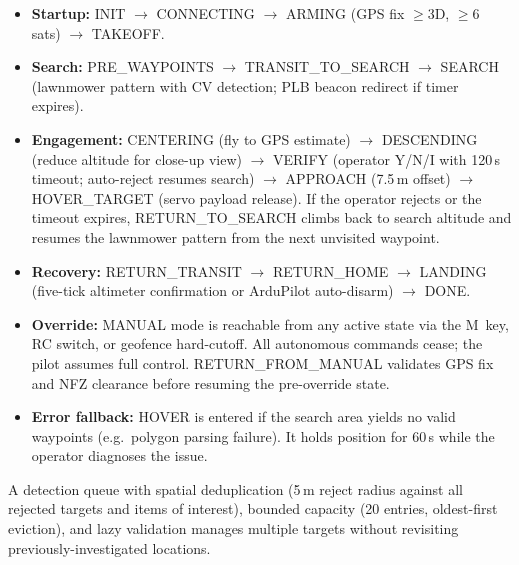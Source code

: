 \begin{itemize}
    \item \textbf{Startup:} INIT $\to$ CONNECTING $\to$ ARMING (GPS fix $\geq$3D, $\geq$6 sats) $\to$ TAKEOFF.
    \item \textbf{Search:} PRE\_WAYPOINTS $\to$ TRANSIT\_TO\_SEARCH $\to$ SEARCH (lawnmower pattern with CV detection; PLB beacon redirect if timer expires).
    \item \textbf{Engagement:} CENTERING (fly to GPS estimate) $\to$ DESCENDING (reduce altitude for close-up view) $\to$ VERIFY (operator Y/N/I with 120\,s timeout; auto-reject resumes search) $\to$ APPROACH (7.5\,m offset) $\to$ HOVER\_TARGET (servo payload release). If the operator rejects or the timeout expires, RETURN\_TO\_SEARCH climbs back to search altitude and resumes the lawnmower pattern from the next unvisited waypoint.
    \item \textbf{Recovery:} RETURN\_TRANSIT $\to$ RETURN\_HOME $\to$ LANDING (five-tick altimeter confirmation or ArduPilot auto-disarm) $\to$ DONE.
    \item \textbf{Override:} MANUAL mode is reachable from any active state via the M~key, RC switch, or geofence hard-cutoff. All autonomous commands cease; the pilot assumes full control. RETURN\_FROM\_MANUAL validates GPS fix and NFZ clearance before resuming the pre-override state.
    \item \textbf{Error fallback:} HOVER is entered if the search area yields no valid waypoints (e.g.\ polygon parsing failure). It holds position for 60\,s while the operator diagnoses the issue.
\end{itemize}

A detection queue with spatial deduplication (5\,m reject radius against all rejected targets and items of interest), bounded capacity (20 entries, oldest-first eviction), and lazy validation manages multiple targets without revisiting previously-investigated locations.

